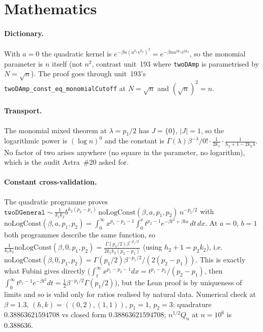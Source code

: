 \documentclass[11pt]{article}
\begin{document}
\section{Mathematics}
\paragraph{Dictionary.} With $a=0$ the quadratic kernel is $e^{-\beta n(u^{k_1}v^{k_2})^2}=e^{-\beta n u^{2k_1}v^{2k_2}}$,
so the monomial parameter is $n$ itself (not $n^2$, contrast unit~193 where \texttt{twoDAmp} is
parametrised by $N=\sqrt n$). The proof goes through unit~193's
\texttt{twoDAmp\_const\_eq\_monomialCutoff} at $N=\sqrt n$ and $(\sqrt n)^2=n$.

\paragraph{Transport.} The monomial mixed theorem at $\lambda=p_1/2$ has $J=\{0\}$, $|J|=1$, so the
logarithmic power is $(\log n)^0$ and the constant is
$\Gamma(\lambda)\beta^{-\lambda}/0!\cdot\frac1{2k_1}\cdot\frac1{h_2+1-2k_2\lambda}$. No factor of two
arises anywhere (no square in the parameter, no logarithm), which is the audit Astra~\#20 asked for.

\paragraph{Constant cross-validation.} The quadratic programme proves
$\texttt{twoDGeneral}\sim\frac1{k_1k_2}b^{k_2(p_2-p_1)}\,\mathrm{noLogConst}(\beta,a,p_1,p_2)\,n^{-p_1/2}$
with $\mathrm{noLogConst}(\beta,a,p_1,p_2)=\int_0^\infty x^{p_1-p_2-1}\int_0^xt^{p_2-1}e^{-\beta t^2+\beta ta}\,dt\,dx$.
At $a=0$, $b=1$ both programmes describe the same function, so
$\frac1{k_1k_2}\mathrm{noLogConst}(\beta,0,p_1,p_2)=\frac{\Gamma(p_1/2)\beta^{-p_1/2}}{2k_1k_2(p_2-p_1)}$
(using $h_2+1=p_2k_2$), i.e.\ $\mathrm{noLogConst}(\beta,0,p_1,p_2)=\Gamma(p_1/2)\beta^{-p_1/2}/(2(p_2-p_1))$.
This is exactly what Fubini gives directly ($\int_t^\infty x^{p_1-p_2-1}dx=t^{p_1-p_2}/(p_2-p_1)$,
then $\int_0^\infty t^{p_1-1}e^{-\beta t^2}dt=\tfrac12\beta^{-p_1/2}\Gamma(p_1/2)$), but the Lean proof
is by uniqueness of limits and so is valid only for ratios realised by natural data. Numerical check
at $\beta=1.3$, $(h,k)=((0,2),(1,1))$, $p_1=1$, $p_2=3$: quadrature $0.38863621594708$ vs closed form
$0.38863621594708$; $n^{1/2}Q_n$ at $n=10^6$ is $0.388636$.
\end{document}
